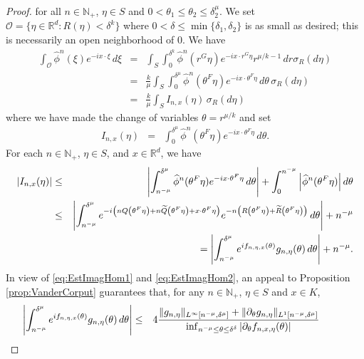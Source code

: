 \documentclass[11pt]{article}
\theoremstyle{remark}
\begin{document}
\begin{proof}
for all $n\in\mathbb{N}_+$, $\eta\in S$ and $0<\theta_1\leq\theta_2\leq\delta_2^{\mu}$. We set $\mathcal{O}=\{\eta\in\mathbb{R}^d:R(\eta)<\delta^k\}$
where $0<\delta\leq \min\{\delta_1,\delta_2\}$ is as small as desired; this is necessarily an open neighborhood of $0$. We have
\begin{eqnarray*}
    \int_{\mathcal{O}}\widehat{\phi}^n(\xi)e^{-ix\cdot\xi}\,d\xi
    &=&
    \int_S\int_0^{\delta^{k}}\widehat{\phi}^n(r^G\eta)e^{-ix\cdot r^G\eta}r^{\mu/k-1}\,dr \sigma_R(d\eta)\\
    &=&
    \frac{k}{\mu}\int_S \int_0^{\delta^{\mu}} \widehat{\phi}^n(\theta^{F} \eta) e^{-i x\cdot\theta^F \eta}  \,d\theta \,\sigma_R(d\eta)\\
    &=&
    \frac{k}{\mu}\int_S I_{n,x}(\eta)\,\sigma_R(d\eta)
\end{eqnarray*}
where we have made the change of variables $\theta=r^{\mu/ k}$ and set
\begin{eqnarray*}
    I_{n,x}(\eta)&=&\int_0^{\delta^{\mu}}\widehat{\phi}^n(\theta^F\eta)e^{-ix\cdot\theta^F\eta}\,d\theta.
\end{eqnarray*}
For each $n\in\mathbb{N}_+$, $\eta\in S$, and $x\in\mathbb{R}^d$, we have
\begin{eqnarray*}
\abs{I_{n,x}(\eta)}
&\leq & 
\abs{\int_{n^{-\mu}}^{\delta^{\mu}}\widehat{\phi}^n(\theta^F\eta)e^{-ix\cdot\theta^F\eta}\,d\theta} +\int_{0}^{n^{-\mu}}\abs{\widehat{\phi}^n(\theta^F\eta)}\,d\theta\\
&\leq& \abs{\int_{n^{-\mu}}^{\delta^\mu} e^{-i\left(nQ\left(\theta^F\eta\right)+n\widetilde{Q}\left(\theta^F\eta\right)+x\cdot\theta^F\eta\right)}e^{-n\left(R\left(\theta^F\eta\right)+\widetilde{R}\left(\theta^F\eta\right)\right)}\,d\theta}+n^{-\mu}\\
& &\hspace{1cm}=\abs{\int_{n^{-\mu}}^{\delta^\mu} e^{i f_{n,\eta,x}(\theta) } g_{n,\eta}(\theta)\,d\theta} 
+ n^{-\mu}.
\end{eqnarray*}
In view of \eqref{eq:EstImagHom1} and \eqref{eq:EstImagHom2}, an appeal to Proposition \ref{prop:VanderCorput} guarantees that, for any $n\in\mathbb{N}_+$, $\eta\in S$ and $x\in K$,
\begin{eqnarray*}
 \hspace{-1cm}\abs{\int_{n^{-\mu}}^{\delta^\mu}e^{if_{n,\eta,x}(\theta)}g_{n,\eta}(\theta)\,d\theta}
    &\leq& 
    4
    \frac{ 
    \|g_{n,\eta}\|_{L^\infty[n^{-\mu},\delta^{\mu}]}
    +
    \|\partial_{\theta}g_{n,\eta}\|_{L^1[n^{-\mu},\delta^{\mu}]}
    }{
    \inf_{n^{-\mu}\leq\theta\leq \delta^{\delta}}|\partial_{\theta}f_{n,x,\eta}(\theta)|
}
\end{eqnarray*}
\end{proof}
\end{document}
